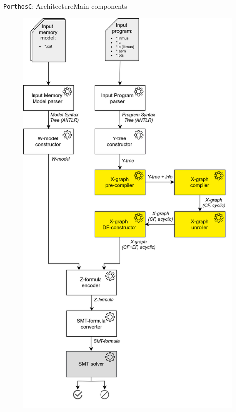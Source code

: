 \documentclass[aspectratio=149]{beamer}
\newcommand{\tool}[1]{\texttt{#1}}
\begin{document}
\begin{frame}{\tool{PorthosC}: Architecture}{Main components}
\begin{minipage}{.5\textwidth}
{\begin{figure}
  \includegraphics[height=.98\textheight,keepaspectratio]{img/arch/general_arch-no_numbering-compiler.png}
\end{figure}}
\end{minipage}
\end{frame}
\end{document}
